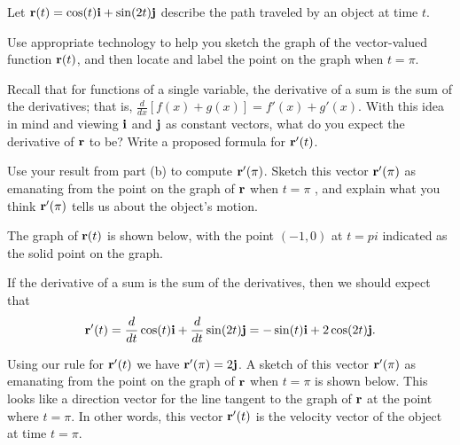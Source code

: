 \begin{pa} \label{PA:9.7} Let $\mathbf{r}(t) = \cos(t) \mathbf{i} + \sin(2t) \mathbf{j}$ describe the path traveled by an object at time $t$. 
    \ba

    \item Use appropriate technology to help you sketch the graph of the vector-valued function $\mathbf{r}(t)$, and then locate and label the point on the graph when $t=\pi$.

    \item Recall that for functions of a single variable, the derivative of a sum is the sum of the derivatives; that is, $\frac{d}{dx}[f(x) + g(x)] = f'(x) + g'(x)$. With this idea in mind and viewing $\mathbf{i}$ and $\mathbf{j}$ as constant vectors, what do you expect the derivative of $\mathbf{r}$ to be?  Write a proposed formula for $\mathbf{r}'(t)$.

    \item Use your result from part (b) to compute $\mathbf{r}'(\pi)$. Sketch this vector $\mathbf{r}'(\pi)$ as emanating from the point on the graph of $\mathbf{r}$ when $t=\pi$ , and explain what you think $\mathbf{r}'(\pi)$ tells us about the object's motion.

    \ea

\end{pa} 

\begin{activitySolution}
    \ba
	\item The graph of $\mathbf{r}(t)$ is shown below, with the point $(-1,0)$ at $t=pi$ indicated as the solid point on the graph. 
\begin{center}
\end{center}

	\item If the derivative of a sum is the sum of the derivatives, then we should expect that 
\[\mathbf{r}'(t) = \frac{d}{dt} \cos(t) \mathbf{i} + \frac{d}{dt} \sin(2t) \mathbf{j} = -\sin(t) \mathbf{i} + 2\cos(2t) \mathbf{j}.\]


    \item Using our rule for $\mathbf{r}'(t)$ we have $\mathbf{r}'(\pi) = 2 \mathbf{j}$. A sketch of this vector $\mathbf{r}'(\pi)$ as emanating from the point on the graph of $\mathbf{r}$ when $t=\pi$ is shown below. This looks like a direction vector for the line tangent to the graph of $\mathbf{r}$ at the point where $t = \pi$. In other words, this vector $\mathbf{r}'(t)$ is the velocity vector of the object at time $t = \pi$. 
\begin{center}
\end{center}
    \ea

\end{activitySolution}

\afterpa 
